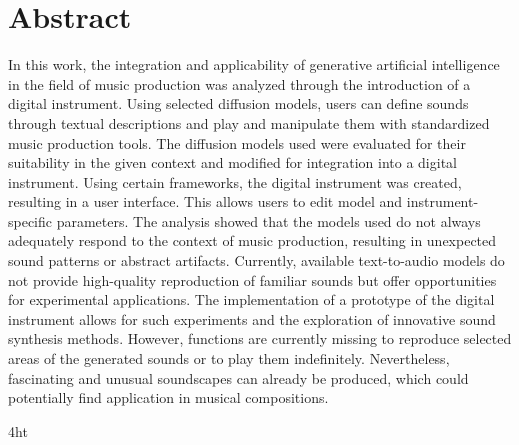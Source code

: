 \documentclass[
  a4paper,  %
  twoside,  %
  bibliography=totoc,
  headsepline,
  cleardoublepage=empty,
  parskip=half,
  draft=false
]{scrbook}
\begin{document}
\cleardoublepage

\section*{Abstract}

In this work, the integration and applicability of generative artificial intelligence in the field of music production was analyzed through the introduction of a digital instrument. Using selected diffusion models, users can define sounds through textual descriptions and play and manipulate them with standardized music production tools. The diffusion models used were evaluated for their suitability in the given context and modified for integration into a digital instrument. Using certain frameworks, the digital instrument was created, resulting in a user interface. This allows users to edit model and instrument-specific parameters. The analysis showed that the models used do not always adequately respond to the context of music production, resulting in unexpected sound patterns or abstract artifacts. Currently, available text-to-audio models do not provide high-quality reproduction of familiar sounds but offer opportunities for experimental applications. The implementation of a prototype of the digital instrument allows for such experiments and the exploration of innovative sound synthesis methods. However, functions are currently missing to reproduce selected areas of the generated sounds or to play them indefinitely. Nevertheless, fascinating and unusual soundscapes can already be produced, which could potentially find application in musical compositions.

\cleardoublepage



\iftex4ht
\else
\fi

%
%

%
%
%
\tableofcontents

\end{document}
